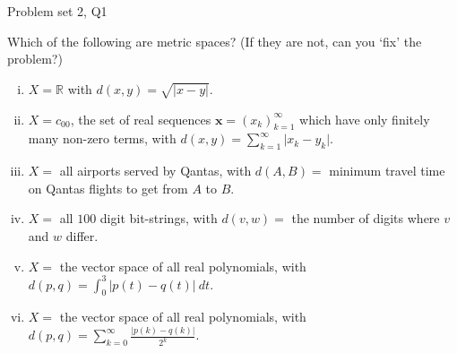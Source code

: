 \begin{problem}{Problem set 2, Q1}{}
    

    Which of the following are metric spaces? (If they are not, can you `fix' the problem?)

    \begin{enumerate}[i)]
        \item $X = \mathbb{R}$ with $d(x, y) = \sqrt{\lvert x - y \rvert}$.
        \item $X = c_{00}$, the set of real sequences $\mathbf{x} = (x_k)_{k = 1}^\infty$ which have only finitely many non-zero terms, with $d(x,y) = \sum_{k = 1}^\infty \lvert x_k - y_k \rvert$.
        \item $X = $ all airports served by Qantas, with $d(A, B) = $ minimum travel time on Qantas flights to get from $A$ to $B$.
        \item $X = $ all $100$ digit bit-strings, with $d(v, w) = $ the number of digits where $v$ and $w$ differ.
        \item $X = $ the vector space of all real polynomials, with $d(p, q) = \displaystyle\int_0^3 \lvert p(t) - q(t) \rvert \ dt$.
        \item $X = $ the vector space of all real polynomials, with $d(p, q) = \displaystyle\sum_{k = 0}^\infty \frac{\lvert p(k) - q(k) \rvert}{2^k}$.
    \end{enumerate}

    \tcblower


\end{problem}
